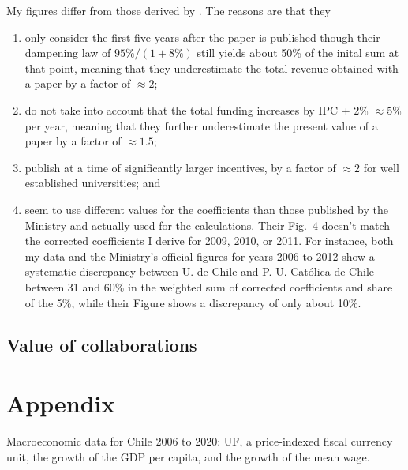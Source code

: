 \documentclass[twocolumn]{article}
\begin{document}
My figures differ from those derived by \citet{RAM12}.  The reasons are that they
\begin{enumerate}
\item only consider the first five years after the paper is published though their dampening law of $95\% / (1 + 8\%)$ still yields about 50\% of the inital sum at that point, meaning that they underestimate the total revenue obtained with a paper by a factor of $\approx 2$;
\item do not take into account that the total funding increases by IPC + 2\% $\approx 5$\% per year, meaning that they further underestimate the present value of a paper by a factor of $\approx 1.5$;
\item publish at a time of significantly larger incentives, by a factor of $\approx 2$ for well established universities; and
\item seem to use different values for the coefficients than those published by the Ministry and actually used for the calculations. Their Fig.~4 doesn't match the corrected coefficients I derive for 2009, 2010, or 2011. For instance, both my data and the Ministry's official figures for years 2006 to 2012 show a systematic discrepancy between U. de Chile and P. U. Católica de Chile between 31 and 60\% in the weighted sum of corrected coefficients and share of the 5\%, while their Figure shows a discrepancy of only about 10\%.
\end{enumerate}

\subsection{Value of collaborations}

\appendix
\section{Appendix}
\begin{table}[t]
\centering
\caption{Macroeconomic data for Chile 2006 to 2020: UF, a price-indexed
fiscal currency unit, the growth of the GDP per capita, and the growth
of the mean wage.}
\label{tab:macro}

\end{table}
\end{document}
